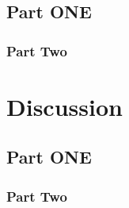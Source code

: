 \documentclass[a4paper,11pt]{article}
\begin{document}
\subsection*{Part ONE}
\label{subsec:res-part1}

\subsubsection*{Part Two}
\label{subsec:res-part2}

\section*{Discussion}
\label{sec:discussion}

\subsection*{Part ONE}
\label{subsec:dis-part1}

\subsubsection*{Part Two}
\label{subsec:dis-part2}
\end{document}

